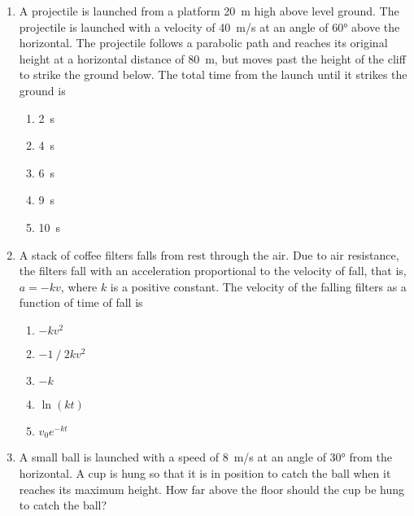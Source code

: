\documentclass{../../oss-apphys}
\begin{document}
\begin{multicols}{2}
\begin{enumerate}[resume,leftmargin=18pt]
  \item A projectile is launched from a platform \SI{20}{m} high above level
    ground. The projectile is launched with a velocity of \SI{40}{m/s} at an
    angle of \ang{60} above the horizontal. The projectile follows a parabolic
    path and reaches its original height at a horizontal distance of \SI{80}{m},
    but moves past the height of the cliff to strike the ground below. The total
    time from the launch until it strikes the ground is


    \begin{enumerate}[noitemsep,topsep=0pt]
    \item\SI{2}{\second}
    \item\SI{4}{\second}
    \item\SI{6}{\second}
    \item\SI{9}{\second}
    \item\SI{10}{\second}
    \end{enumerate}

  \item A stack of coffee filters falls from rest through the air. Due to air
    resistance, the filters fall with an acceleration proportional to the
    velocity of fall, that is, $a=-kv$, where $k$ is a positive constant. The
    velocity of the falling filters as a function of time of fall is
    \begin{enumerate}[noitemsep,topsep=0pt,leftmargin=18pt,label=(\Alph*)]
    \item $-kv^2$
    \item $-1⁄2kv^2$
    \item $-k$
    \item $\ln(kt)$
    \item $v_0e^{-kt}$
    \end{enumerate}
    
    \columnbreak
    
  \item A small ball is launched with a speed of \SI{8}{m/s} at an angle of
    \ang{30} from the horizontal. A cup is hung so that it is in position to
    catch the ball when it reaches its maximum height. How far above the floor
    should the cup be hung to catch the ball?
    

\end{enumerate}
\end{multicols}
\end{document}
